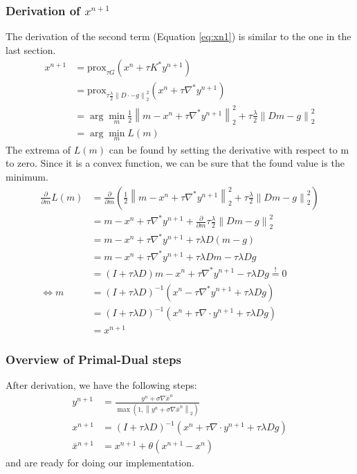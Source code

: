 \documentclass{paper}
\newcommand{\prox}{\text{prox}}
\newcommand{\twonorm}[1]{\left\lVert#1\right\rVert_2}
\begin{document}
\subsubsection*{Derivation of $x^{n+1}$}
The derivation of the second term (Equation \eqref{eq:xn1}) is similar 
to the one in the last section. 
\begin{align}
x^{n+1} &= \prox_{\tau G}(x^n + \tau K^* y^{n+1}) \\
	    &= \prox_{\tau \frac{\lambda}{2}\twonorm{ D\cdot - g}^2}(x^n + \tau \nabla^* y^{n+1}) \\
	    &= \arg \min_m \frac{1}{2} \twonorm{m - x^n + \tau \nabla^* y^{n+1}}^2 + \tau \frac{\lambda}{2}\twonorm{ Dm - g}^2 \\
	    &= \arg \min_m L(m)
\end{align}
The extrema of $L(m)$ can be found by setting the derivative 
with respect to m to zero. Since it is a convex function, we can be sure that the 
found value is the minimum.
\begin{align}
\frac{\partial}{\partial m} L(m) &= \frac{\partial}{\partial m} \left( \frac{1}{2} \twonorm{m - x^n + \tau \nabla^* y^{n+1}}^2 
+ \tau \frac{\lambda}{2}\twonorm{ Dm - g}^2 \right) \\
&= m - x^n + \tau \nabla^* y^{n+1} +
\frac{\partial}{\partial m} \tau \frac{\lambda}{2}\twonorm{Dm - g}^2 \\
&= m - x^n + \tau \nabla^* y^{n+1} +
\tau \lambda D(m - g) \\
&= m - x^n + \tau \nabla^* y^{n+1} +
\tau \lambda Dm - \tau \lambda D g \\
&= (I + \tau \lambda D)m - x^n + \tau \nabla^* y^{n+1} -
\tau \lambda D g \overset{!}{=} 0 \\
\Longleftrightarrow m &= (I + \tau \lambda D)^{-1} 
(x^n - \tau \nabla^* y^{n+1} + \tau \lambda D g)
 \\
&=  (I + \tau \lambda D)^{-1} (x^n + \tau \nabla \cdot y^{n+1} + \tau \lambda D g) \\
&= x^{n+1}
\end{align}

\subsubsection*{Overview of Primal-Dual steps}
After derivation, we have the following steps:
\begin{align}
y^{n+1} &= \frac{y^n + \sigma \nabla \bar{x}^n}
				{\max \left( 1, \twonorm{y^n + \sigma \nabla \bar{x}^n} \right)} \\
x^{n+1} &= (I + \tau \lambda D)^{-1} 
           (x^n + \tau \nabla \cdot y^{n+1} + \tau \lambda D g) \\
\bar{x}^{n+1} &= x^{n+1} + \theta(x^{n+1} - x^n)
\end{align}
and are ready for doing our implementation.
\clearpage
\end{document}
